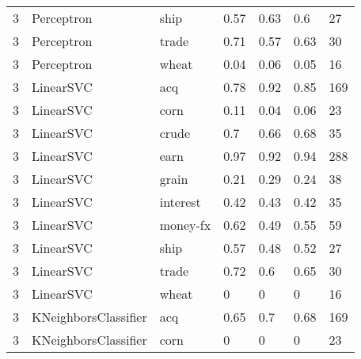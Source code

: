 \documentclass{article}
\begin{document}
\begin{table}[h]
\begin{tabular}{lllllll}
3             & Perceptron             & ship            & 0.57               & 0.63            & 0.6               & 27               \\
3             & Perceptron             & trade           & 0.71               & 0.57            & 0.63              & 30               \\
3             & Perceptron             & wheat           & 0.04               & 0.06            & 0.05              & 16               \\
3             & LinearSVC              & acq             & 0.78               & 0.92            & 0.85              & 169              \\
3             & LinearSVC              & corn            & 0.11               & 0.04            & 0.06              & 23               \\
3             & LinearSVC              & crude           & 0.7                & 0.66            & 0.68              & 35               \\
3             & LinearSVC              & earn            & 0.97               & 0.92            & 0.94              & 288              \\
3             & LinearSVC              & grain           & 0.21               & 0.29            & 0.24              & 38               \\
3             & LinearSVC              & interest        & 0.42               & 0.43            & 0.42              & 35               \\
3             & LinearSVC              & money-fx        & 0.62               & 0.49            & 0.55              & 59               \\
3             & LinearSVC              & ship            & 0.57               & 0.48            & 0.52              & 27               \\
3             & LinearSVC              & trade           & 0.72               & 0.6             & 0.65              & 30               \\
3             & LinearSVC              & wheat           & 0                  & 0               & 0                 & 16               \\
3             & KNeighborsClassifier   & acq             & 0.65               & 0.7             & 0.68              & 169              \\
3             & KNeighborsClassifier   & corn            & 0                  & 0               & 0                 & 23               \\

\end{tabular}
\end{table}
\end{document}
